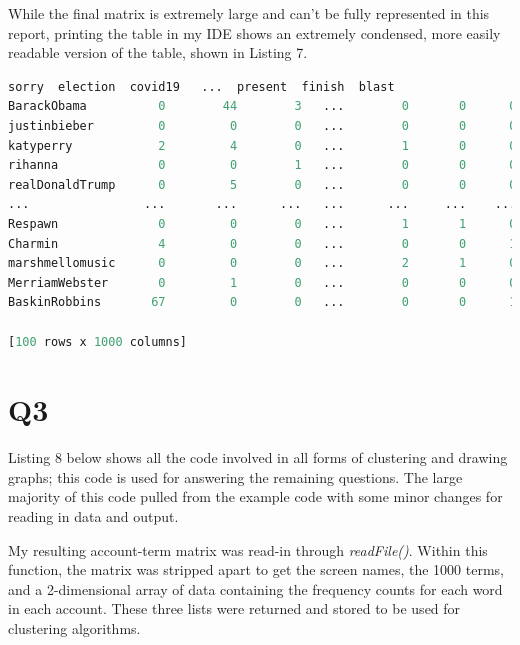 \documentclass[12pt]{article}
\begin{document}
While the final matrix is extremely large and can't be fully represented in this report, printing the table in my IDE shows an extremely condensed, more easily readable version of the table, shown in Listing 7. 



\begin{lstlisting}[language=Python, caption={Condensed account-term matrix captured in output}, label=lst:copy]
                 sorry  election  covid19   ...  present  finish  blast
BarackObama          0        44        3   ...        0       0      0
justinbieber         0         0        0   ...        0       0      0
katyperry            2         4        0   ...        1       0      0
rihanna              0         0        1   ...        0       0      0
realDonaldTrump      0         5        0   ...        0       0      0
...                ...       ...      ...   ...      ...     ...    ...
Respawn              0         0        0   ...        1       1      0
Charmin              4         0        0   ...        0       0      1
marshmellomusic      0         0        0   ...        2       1      0
MerriamWebster       0         1        0   ...        0       0      0
BaskinRobbins       67         0        0   ...        0       0      1

[100 rows x 1000 columns]
\end{lstlisting}

\section*{Q3}
Listing 8 below shows all the code involved in all forms of clustering and drawing graphs; this code is used for answering the remaining questions. The large majority of this code pulled from the example code with some minor changes for reading in data and output.

\par My resulting account-term matrix was read-in through \emph{readFile()}. Within this function, the matrix was stripped apart to get the screen names, the 1000 terms, and a 2-dimensional array of data containing the frequency counts for each word in each account. These three lists were returned and stored to be used for clustering algorithms. 


\end{document}
